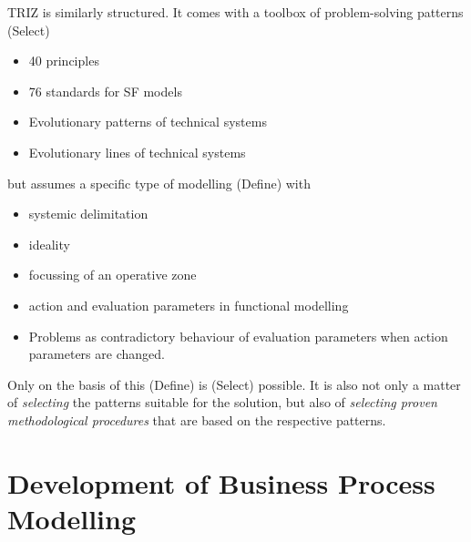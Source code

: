 \documentclass[11pt,a4paper]{article}
\begin{document}
TRIZ is similarly structured. It comes with a toolbox of problem-solving
patterns (Select)
\begin{itemize}
\item 40 principles
\item 76 standards for SF models
\item Evolutionary patterns of technical systems
\item Evolutionary lines of technical systems
\end{itemize}
but assumes a specific type of modelling (Define) with
\begin{itemize}
\item systemic delimitation
\item ideality
\item focussing of an operative zone
\item action and evaluation parameters in functional modelling
\item Problems as contradictory behaviour of evaluation parameters when action
  parameters are changed.
\end{itemize}
Only on the basis of this (Define) is (Select) possible. It is also not only a
matter of \emph{selecting} the patterns suitable for the solution, but also of
\emph{selecting proven methodological procedures} that are based on the
respective patterns.
\newpage

\section{Development of Business Process Modelling}
\end{document}

